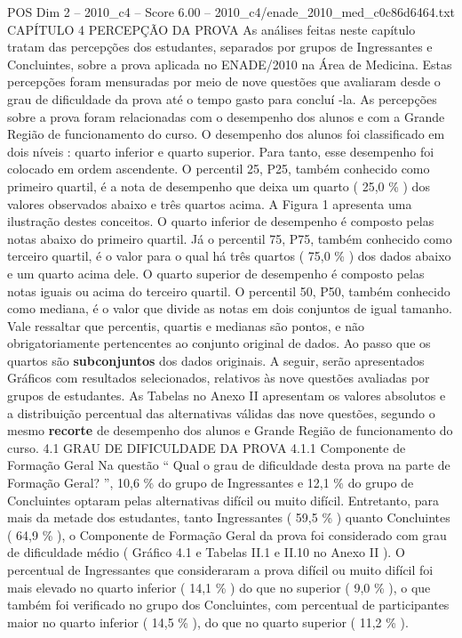 \begin{textsample}{POS Dim 2 – 2010\_c4 – Score 6.00 – 2010\_c4/enade\_2010\_med\_c0c86d6464.txt}  \label{ex:f2_pos_146}
CAPÍTULO 4 PERCEPÇÃO DA PROVA As análises feitas neste capítulo tratam das percepções dos estudantes, separados por grupos de Ingressantes e Concluintes, sobre a prova aplicada no ENADE/2010 na Área de Medicina.
Estas percepções foram mensuradas por meio de nove questões que avaliaram desde o grau de dificuldade da prova até o tempo gasto para concluí -la.
As percepções sobre a prova foram relacionadas com o desempenho dos alunos e com a Grande Região de funcionamento do curso.
O desempenho dos alunos foi classificado em dois níveis : quarto inferior e quarto superior.
Para tanto, esse desempenho foi colocado em ordem ascendente.
O percentil 25, P25, também conhecido como primeiro quartil, é a nota de desempenho que deixa um quarto ( 25,0 \% ) dos valores observados abaixo e três quartos acima.
A Figura 1 apresenta uma ilustração destes conceitos.
O quarto inferior de desempenho é composto pelas notas abaixo do primeiro quartil.
Já o percentil 75, P75, também conhecido como terceiro quartil, é o valor para o qual há três quartos ( 75,0 \% ) dos dados abaixo e um quarto acima dele.
O quarto superior de desempenho é composto pelas notas iguais ou acima do terceiro quartil.
O percentil 50, P50, também conhecido como mediana, é o valor que divide as notas em dois conjuntos de igual tamanho.
Vale ressaltar que percentis, quartis e medianas são pontos, e não obrigatoriamente pertencentes ao conjunto original de dados.
Ao passo que os quartos são \textbf{subconjuntos} dos dados originais.
A seguir, serão apresentados Gráficos com resultados selecionados, relativos às nove questões avaliadas por grupos de estudantes.
As Tabelas no Anexo II apresentam os valores absolutos e a distribuição percentual das alternativas válidas das nove questões, segundo o mesmo \textbf{recorte} de desempenho dos alunos e Grande Região de funcionamento do curso. 4.1 GRAU DE DIFICULDADE DA PROVA 4.1.1 Componente de Formação Geral Na questão “ Qual o grau de dificuldade desta prova na parte de Formação Geral? ”, 10,6 \% do grupo de Ingressantes e 12,1 \% do grupo de Concluintes optaram pelas alternativas difícil ou muito difícil.
Entretanto, para mais da metade dos estudantes, tanto Ingressantes ( 59,5 \% ) quanto Concluintes ( 64,9 \% ), o Componente de Formação Geral da prova foi considerado com grau de dificuldade médio ( Gráfico 4.1 e Tabelas II.1 e II.10 no Anexo II ).
O percentual de Ingressantes que consideraram a prova difícil ou muito difícil foi mais elevado no quarto inferior ( 14,1 \% ) do que no superior ( 9,0 \% ), o que também foi verificado no grupo dos Concluintes, com percentual de participantes maior no quarto inferior ( 14,5 \% ), do que no quarto superior ( 11,2 \% ).

\end{textsample}
